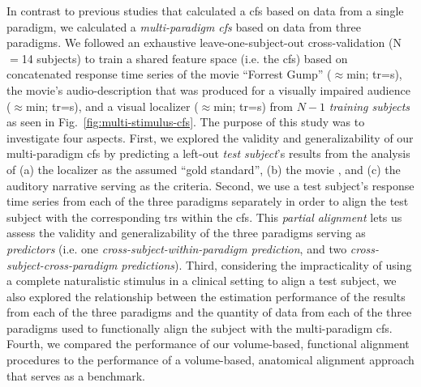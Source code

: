 In contrast to previous studies \citep[e.g.][]{jiahui2020predicting,
guntupalli2016model, haxby2011common} that calculated a \ac{cfs} based on data
from a single paradigm, we calculated a \textit{multi-paradigm \ac{cfs}} based
on data from three paradigms.
We followed an exhaustive leave-one-subject-out cross-validation (N$=$14
subjects) to train a shared feature space (i.e. the \ac{cfs}) based on
concatenated response time series of
%
the movie ``Forrest Gump'' ($\approx$\unit[120]{min}; \ac{tr}=\unit[2]{s}),
%
the movie's audio-description  that was produced for a visually impaired
audience ($\approx$\unit[120]{min}; \ac{tr}=\unit[2]{s}), and
%
a visual localizer ($\approx$\unit[21]{min}; \ac{tr}=\unit[2]{s})
%
from $N-1$ \textit{training subjects} as seen in
Fig.~\ref{fig:multi-stimulus-cfs}.
The purpose of this study was to investigate four aspects.
%
First, we explored the validity and generalizability of our multi-paradigm
\ac{cfs} by predicting a left-out \textit{test subject}'s results from the
analysis of
%
(a) the localizer \citep{sengupta2016extension} as the assumed ``gold
standard'',
%
(b) the movie \citep{haeusler2022processing}, and
%
(c) the auditory narrative \citep{haeusler2022processing}
%
serving as the criteria.
Second, we use a test subject's response time series from each of the three
paradigms separately in order to align the test subject with the corresponding
\acp{tr} within the \ac{cfs}.
%
This \textit{partial alignment} lets us assess the validity and generalizability
of the three paradigms serving as \textit{predictors} (i.e. one
\textit{cross-subject-within-paradigm prediction}, and two
\textit{cross-subject-cross-paradigm predictions}).
Third, considering the impracticality of using a complete naturalistic stimulus
in a clinical setting to align a test subject, we also explored the relationship
between the estimation performance of the results from each of the three
paradigms and the quantity of data from each of the three paradigms used to
functionally align the subject with the multi-paradigm \ac{cfs}.
Fourth, we compared the performance of our volume-based, functional alignment
procedures to the performance of a volume-based, anatomical alignment approach
that serves as a benchmark.

%

